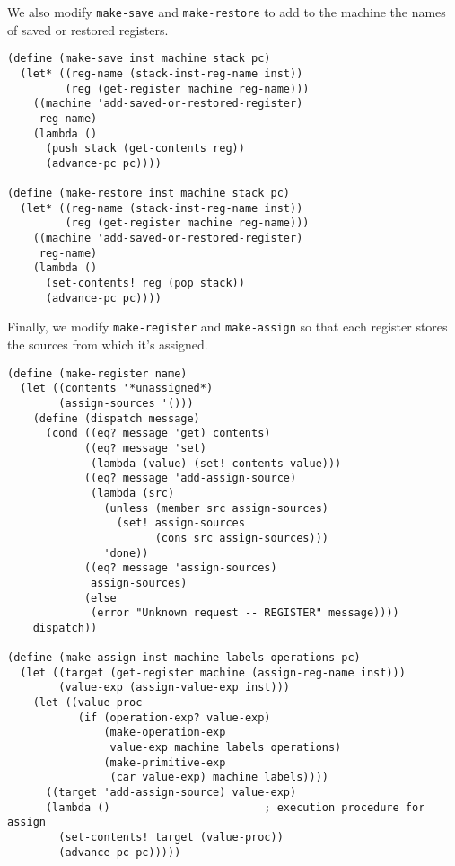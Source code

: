\documentclass[a4paper,12pt]{article}
\begin{document}
We also modify \lstinline!make-save! and \lstinline!make-restore! to
add to the machine the names of saved or restored registers.

\begin{lstlisting}
(define (make-save inst machine stack pc)
  (let* ((reg-name (stack-inst-reg-name inst))
         (reg (get-register machine reg-name)))
    ((machine 'add-saved-or-restored-register)
     reg-name)
    (lambda ()
      (push stack (get-contents reg))
      (advance-pc pc))))

(define (make-restore inst machine stack pc)
  (let* ((reg-name (stack-inst-reg-name inst))
         (reg (get-register machine reg-name)))
    ((machine 'add-saved-or-restored-register)
     reg-name)
    (lambda ()
      (set-contents! reg (pop stack))
      (advance-pc pc))))
\end{lstlisting}

Finally, we modify \lstinline!make-register! and
\lstinline!make-assign! so that each register stores the sources from
which it's assigned.

\begin{lstlisting}
(define (make-register name)
  (let ((contents '*unassigned*)
        (assign-sources '()))
    (define (dispatch message)
      (cond ((eq? message 'get) contents)
            ((eq? message 'set)
             (lambda (value) (set! contents value)))
            ((eq? message 'add-assign-source)
             (lambda (src)
               (unless (member src assign-sources)
                 (set! assign-sources
                       (cons src assign-sources)))
               'done))
            ((eq? message 'assign-sources)
             assign-sources)
            (else
             (error "Unknown request -- REGISTER" message))))
    dispatch))

(define (make-assign inst machine labels operations pc)
  (let ((target (get-register machine (assign-reg-name inst)))
        (value-exp (assign-value-exp inst)))
    (let ((value-proc
           (if (operation-exp? value-exp)
               (make-operation-exp
                value-exp machine labels operations)
               (make-primitive-exp
                (car value-exp) machine labels))))
      ((target 'add-assign-source) value-exp)
      (lambda ()                        ; execution procedure for assign
        (set-contents! target (value-proc))
        (advance-pc pc)))))
\end{lstlisting}
\end{document}
